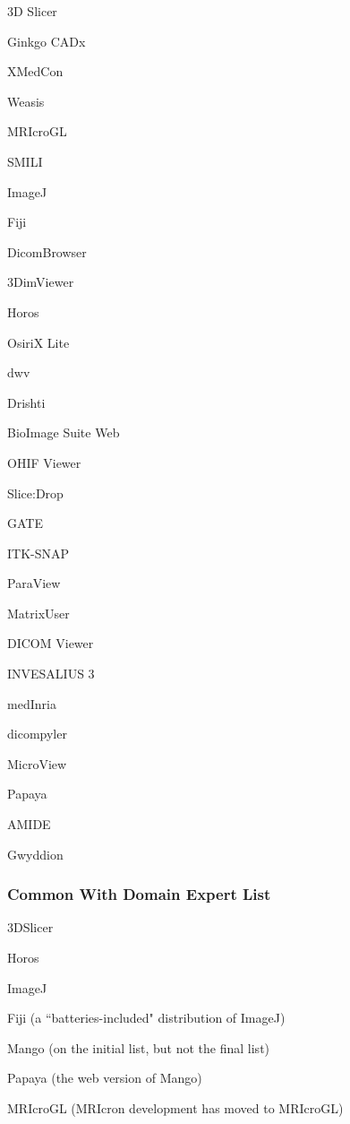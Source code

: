 \documentclass[t,12pt,numbers,fleqn]{beamer}
\begin{document}
\begin{frame}[plain]

\begin{multicols}{2}	
	\bi
      \item 3D Slicer
      \item  Ginkgo CADx
      \item XMedCon
      \item Weasis
      \item MRIcroGL
      \item SMILI
      \item ImageJ
      \item Fiji
      \item DicomBrowser
        \item 3DimViewer
        \item Horos
        \item OsiriX Lite
        \item dwv
        \item Drishti
        \item BioImage Suite Web
        \item OHIF Viewer
          \item Slice:Drop
          \item GATE
          \item ITK-SNAP
          \item ParaView
          \item MatrixUser
          \item DICOM Viewer
          \item INVESALIUS 3
            \item medInria
            \item dicompyler
            \item MicroView
            \item Papaya
            \item AMIDE
            \item Gwyddion \ei
\end{multicols}

\end{frame}


\begin{frame}
\frametitle{Common With Domain Expert List}

\bi
\item 3DSlicer
\item Horos
\item ImageJ
\item Fiji (a ``batteries-included" distribution of ImageJ)
\item Mango (on the initial list, but not the final list)
\item Papaya (the web version of Mango)
\item MRIcroGL (MRIcron development has moved to MRIcroGL)
\ei

\end{frame}
\end{document}
